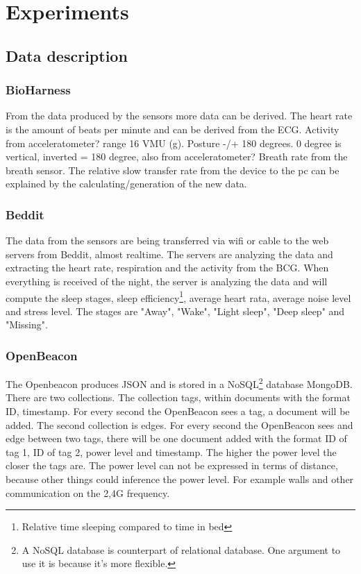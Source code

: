 \section{Experiments}
	\subsection{Data description}
		\subsubsection{BioHarness}
			From the data produced by the sensors more data can be derived. The heart rate is the amount of beats per minute and can be derived from the ECG.  
			Activity from acceleratometer? range 16 VMU (g).
			Posture -/+ 180 degrees. 0 degree is vertical, inverted = 180 degree, also from acceleratometer?
			Breath rate from the breath sensor. 
			The relative slow transfer rate from the device to the pc can be explained by the calculating/generation of the new data.
		\subsubsection{Beddit}
			The data from the sensors are being transferred via wifi or cable to the web servers from Beddit, almost realtime. The servers are analyzing the data and extracting the heart rate, respiration and the activity from the BCG. When everything is received of the night, the server is analyzing the data and will compute the sleep stages, sleep efficiency\footnote{Relative time sleeping compared to time in bed}, average heart rata, average noise level and stress level. The stages are "Away", "Wake", "Light sleep", "Deep sleep" and "Missing".
		\subsubsection{OpenBeacon}
			The Openbeacon produces JSON and is stored in a NoSQL\footnote{A NoSQL database is counterpart of relational database. One argument to use it is because it's more flexible.} database MongoDB.
			There are two collections. The collection tags, within documents with the format ID, timestamp. For every second the OpenBeacon sees a tag, a document will be added.
			The second collection is edges. For every second the OpenBeacon sees and edge between two tags, there will be one document added with the format ID of tag 1, ID of tag 2, power level and timestamp.
			The higher the power level the closer the tags are. The power level can not be expressed in terms of distance, because other things could inference the power level. For example walls and other communication on the 2,4G frequency.
